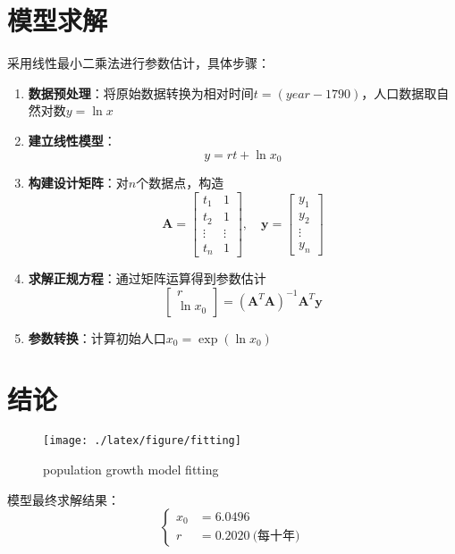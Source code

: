 \section{模型求解}
采用线性最小二乘法进行参数估计，具体步骤：
\begin{enumerate}
    \item \textbf{数据预处理}：将原始数据转换为相对时间$t = (year - 1790)$，人口数据取自然对数$y = \ln x$
    
    \item \textbf{建立线性模型}：
    \begin{equation}
        y = r t + \ln x_0 \label{eq:linear_model}
    \end{equation}

    \item \textbf{构建设计矩阵}：对$n$个数据点，构造
    \begin{equation}
        \mathbf{A} = \begin{bmatrix}
            t_1 & 1 \\
            t_2 & 1 \\
            \vdots & \vdots \\
            t_n & 1
        \end{bmatrix}, \quad
        \mathbf{y} = \begin{bmatrix}
            y_1 \\ y_2 \\ \vdots \\ y_n
        \end{bmatrix}
    \end{equation}

    \item \textbf{求解正规方程}：通过矩阵运算得到参数估计
    \begin{equation}
        \begin{bmatrix}
            r \\ \ln x_0
        \end{bmatrix} = (\mathbf{A}^T \mathbf{A})^{-1} \mathbf{A}^T \mathbf{y}
    \end{equation}

    \item \textbf{参数转换}：计算初始人口$x_0 = \exp(\ln x_0)$
\end{enumerate}

\section{结论}
\begin{figure}[H]
    \centering
    \texttt{[image: ./latex/figure/fitting]}
    \caption{population growth model fitting}
    \label{fig:conclusion}
\end{figure}

模型最终求解结果：
\begin{equation}
    \left\{
    \begin{aligned}
        x_0 &= 6.0496 \\
        r &= 0.2020\ \text{(每十年)}
    \end{aligned}
    \right.
\end{equation}